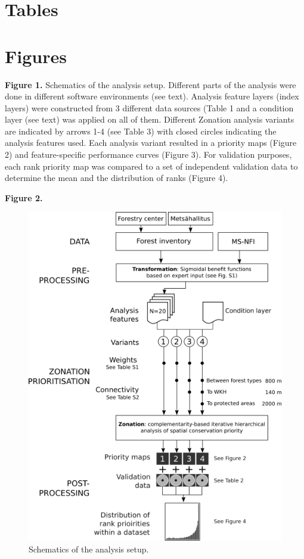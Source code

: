 \documentclass[]{article}
\begin{document}
\section{Tables}

\section{Figures}

\textbf{Figure 1.} Schematics of the analysis setup. Different parts of
the analysis were done in different software environments (see text).
Analysis feature layers (index layers) were constructed from 3 different
data sources (Table 1 and a condition layer (see text) was applied on
all of them. Different Zonation analysis variants are indicated by
arrows 1-4 (see Table 3) with closed circles indicating the analysis
features used. Each analysis variant resulted in a priority maps (Figure
2) and feature-specific performance curves (Figure 3). For validation
purposes, each rank priority map was compared to a set of independent
validation data to determine the mean and the distribution of ranks
(Figure 4).

\textbf{Figure 2.}

\begin{figure}
  \includegraphics{figs/Fig1_w500.png}
  \caption{Schematics of the analysis setup.}
  \end{figure}
\end{document}
